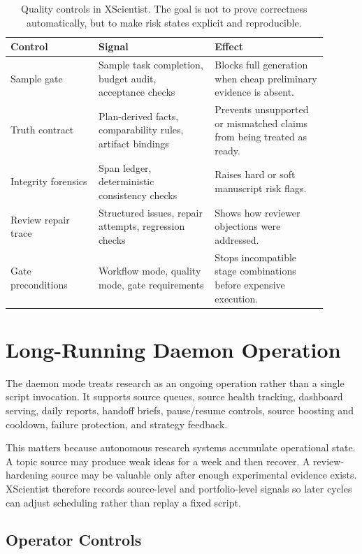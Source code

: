 \documentclass[11pt]{article}
\begin{document}
\begin{table}[t]
\centering
\small
\begin{tabular}{p{0.25\linewidth}p{0.33\linewidth}p{0.32\linewidth}}
\toprule
Control & Signal & Effect \\
\midrule
Sample gate & Sample task completion, budget audit, acceptance checks &
Blocks full generation when cheap preliminary evidence is absent. \\
Truth contract & Plan-derived facts, comparability rules, artifact bindings &
Prevents unsupported or mismatched claims from being treated as ready. \\
Integrity forensics & Span ledger, deterministic consistency checks & Raises
hard or soft manuscript risk flags. \\
Review repair trace & Structured issues, repair attempts, regression checks &
Shows how reviewer objections were addressed. \\
Gate preconditions & Workflow mode, quality mode, gate requirements & Stops
incompatible stage combinations before expensive execution. \\
\bottomrule
\end{tabular}
\normalsize
\caption{Quality controls in XScientist. The goal is not to prove correctness
automatically, but to make risk states explicit and reproducible.}
\label{tab:quality-controls}
\end{table}

\section{Long-Running Daemon Operation}

The daemon mode treats research as an ongoing operation rather than a single
script invocation. It supports source queues, source health tracking,
dashboard serving, daily reports, handoff briefs, pause/resume controls,
source boosting and cooldown, failure protection, and strategy feedback.

This matters because autonomous research systems accumulate operational
state. A topic source may produce weak ideas for a week and then recover. A
review-hardening source may be valuable only after enough experimental
evidence exists. XScientist therefore records source-level and portfolio-level
signals so later cycles can adjust scheduling rather than replay a fixed
script.

\subsection{Operator Controls}
\end{document}
